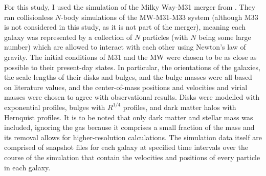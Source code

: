 \documentclass[twocolumn]{aastex631}
\begin{document}
For this study, I used the simulation of the Milky Way-M31 merger from \cite{van_der_Marel+2012}.
They ran collisionless $N$-body simulations of the MW-M31-M33 system (although M33 is not considered in this study, as it is not part of the merger), meaning each galaxy was represented by a collection of $N$ particles (with $N$ being some large number) which are allowed to interact with each other using Newton's law of gravity.
The initial conditions of M31 and the MW were chosen to be as close as possible to their present-day states. 
In particular, the orientations of the galaxies, the scale lengths of their disks and bulges, and the bulge masses were all based on literature values, and the center-of-mass positions and velocities and virial masses were chosen to agree with observational results.
Disks were modelled with exponential profiles, bulges with $R^{1/4}$ profiles, and dark matter halos with Hernquist profiles. 
It is to be noted that only dark matter and stellar mass was included, ignoring the gas because it comprises a small fraction of the mass and its removal allows for higher-resolution calculations.
The simulation data itself are comprised of snapshot files for each galaxy at specified time intervals over the course of the simulation that contain the velocities and positions of every particle in each galaxy.
\end{document}
